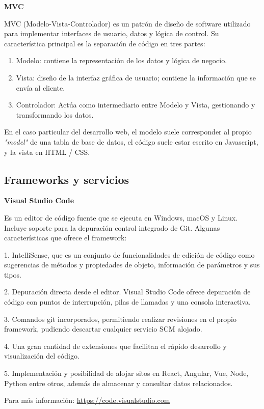 \textbf{MVC}

MVC (Modelo-Vista-Controlador) es un patrón de diseño de software utilizado para implementar interfaces de usuario, datos y lógica de control. Su característica  principal es la separación de código en tres partes:
\begin{enumerate}
	\item Modelo: contiene la representación de los datos y lógica de negocio.
	\item Vista:  diseño de la interfaz gráfica de usuario; contiene la información que se envía al cliente.
	\item Controlador: Actúa como intermediario entre Modelo y Vista, gestionando y transformando los datos.
\end{enumerate}

En el caso particular del desarrollo web, el modelo suele corresponder al propio \emph{"model"} de una tabla de base de datos, el  código suele estar escrito en Javascript, y la vista  en HTML / CSS.

\subsection{Frameworks y servicios}

\textbf{Visual Studio Code}

Es un editor de código fuente  que se ejecuta en Windows, macOS y Linux. Incluye soporte  para la depuración control integrado de Git. Algunas características que ofrece el framework:

1. IntelliSense, que es un conjunto de funcionalidades de edición de código como sugerencias  de métodos y propiedades de objeto, información de parámetros y sus tipos.

2. Depuración directa desde el editor. Visual Studio Code ofrece depuración de código con puntos de  interrupción, pilas de llamadas y una consola interactiva.

3. Comandos git incorporados, permitiendo realizar revisiones en el propio framework, pudiendo descartar cualquier servicio SCM alojado.

4.  Una gran cantidad de extensiones que facilitan el rápido desarrollo y visualización del código.

5. Implementación y posibilidad de alojar sitos en React, Angular, Vue, Node, Python entre otros, además de almacenar y consultar datos relacionados.

Para más información: \url{https://code.visualstudio.com}

